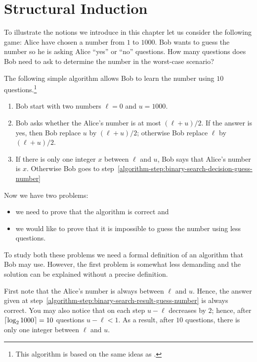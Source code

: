 \chapter{Structural Induction}
To illustrate the notions we introduce in this chapter let us consider the
following game: Alice have chosen a number from $1$ to $1000$. Bob wants to
guess the number so he is asking Alice ``yes'' or ``no'' questions.
How many questions does Bob need to ask to determine the number in the
worst-case scenario?

The following simple algorithm allows Bob to learn the number using $10$
questions.\footnote{%
  This algorithm is based on the same ideas as .
}
\begin{enumerate}
  \item Bob start with two numbers $\ell = 0$ and $u = 1000$.
  \item \label{algorithm-step:binary-search-decision-guess-number}
    Bob asks whether the Alice's number is at most $(\ell + u) / 2$.
    If the answer is yes, then Bob replace $u$ by $(\ell + u) / 2$;
    otherwise Bob replace $\ell$ by $(\ell + u) / 2$.
  \item \label{algorithm-step:binary-search-result-guess-number}
    If there is only one integer $x$ between $\ell$ and $u$, Bob
    says that Alice's number is $x$. Otherwise Bob goes to
    step~\ref{algorithm-step:binary-search-decision-guess-number}
\end{enumerate}

Now we have two problems:
\begin{itemize}
  \item we need to prove that the algorithm is correct and
  \item we would like to prove that it is impossible to guess the number
    using less questions.
\end{itemize}

To study both these problems we need a formal definition of an algorithm that
Bob may use. However, the first problem is somewhat less demanding and
the solution can be explained without a precise definition.

First note that the Alice's number is always between $\ell$ and $u$. Hence,
the answer given at step~\ref{algorithm-step:binary-search-result-guess-number}
is always correct. You may also notice that on each step $u - \ell$
decreases by $2$; hence, after $\left\lceil {\log_2 1000} \right\rceil = 10$ questions $u - \ell < 1$.
As a result, after $10$ questions, there is only one integer between $\ell$ and
$u$.

